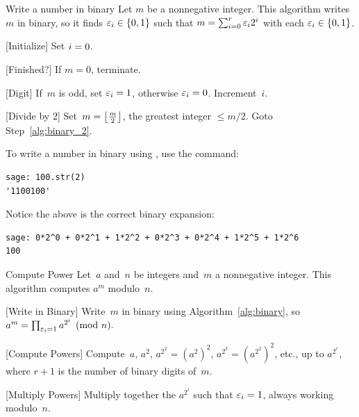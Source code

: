 \begin{algorithm}{Write a number in binary}\label{alg:binary}%
Let $m$ be a nonnegative integer.  This algorithm writes~$m$ in
binary, so it finds $\varepsilon_i\in\{0,1\}$ such that
$m=\sum_{i=0}^r \varepsilon_i 2^i$ with each $\varepsilon_i\in\{0,1\}$.
\begin{steps}
\item{}[Initialize] Set $i= 0$.
\item{}[Finished?]\label{alg:binary_2} If $m=0$, terminate.
\item{}[Digit]
If~$m$ is odd, set $\varepsilon_i= 1$, otherwise $\varepsilon_i= 0$.
Increment~$i$.
\item{}[Divide by $2$]
Set~$m = \left\lfloor\frac{m}{2}\right\rfloor$, the
greatest integer $\leq m/2$.  Goto Step~\ref{alg:binary_2}.
\end{steps}
\end{algorithm}

\begin{sg}
To write a number in binary using \sage, use the 
command:
\begin{verbatim}
sage: 100.str(2)
'1100100'
\end{verbatim}
Notice the above is the correct binary expansion:
\begin{verbatim}
sage: 0*2^0 + 0*2^1 + 1*2^2 + 0*2^3 + 0*2^4 + 1*2^5 + 1*2^6
100
\end{verbatim}
\end{sg}

\begin{algorithm}{Compute Power}\label{alg:power}
Let~$a$ and~$n$ be integers and~$m$ a nonnegative integer.
This algorithm computes $a^m$ modulo~$n$.
\begin{steps}
\item{}[Write in Binary] Write~$m$ in binary using Algorithm~\ref{alg:binary}, so
$
   a^m  = \prod_{\varepsilon_i = 1} a^{2^i}\pmod{n}.
$
\item{}[Compute Powers] Compute~$a$,  $a^2$, $a^{2^2} = (a^2)^2$,
$a^{2^3} = (a^{2^2})^2$, etc., up
to $a^{2^r}$, where $r+1$ is the number of binary
digits of~$m$.
\item{}[Multiply Powers] Multiply together the
$a^{2^i}$ such that $\varepsilon_i=1$,
always working modulo~$n$.
\end{steps}
\end{algorithm}

